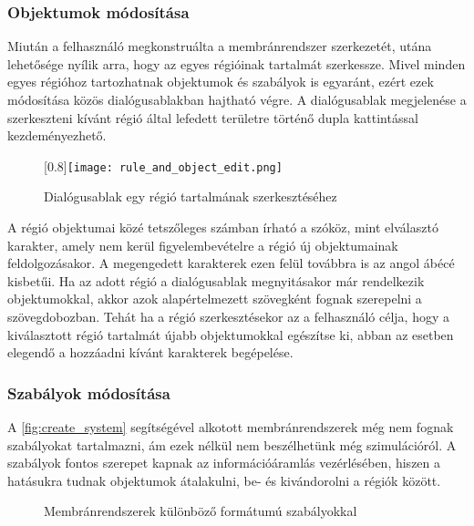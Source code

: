 
\subsubsection{Objektumok módosítása}

Miután a felhasználó megkonstruálta a membránrendszer szerkezetét, utána lehetősége nyílik arra, hogy az egyes régióinak tartalmát szerkessze. Mivel minden egyes régióhoz tartozhatnak objektumok és szabályok is egyaránt, ezért ezek módosítása közös dialógusablakban hajtható végre. A dialógusablak megjelenése a szerkeszteni kívánt régió által lefedett területre történő dupla kattintással kezdeményezhető. 

\begin{figure}[H]
	\centering
	\scalebox{0.8}[0.8]{\texttt{[image: rule\_and\_object\_edit.png]}}
	\caption{Dialógusablak egy régió tartalmának szerkesztéséhez}
	\label{fig:obj_edit}
\end{figure}

A régió objektumai közé tetszőleges számban írható a szóköz, mint elválasztó karakter, amely nem kerül figyelembevételre a régió új objektumainak feldolgozásakor. A megengedett karakterek ezen felül továbbra is az angol ábécé kisbetűi. Ha az adott régió a dialógusablak megnyitásakor már rendelkezik objektumokkal, akkor azok alapértelmezett szövegként fognak szerepelni a szövegdobozban. Tehát ha a régió szerkesztésekor az a felhasználó célja, hogy a kiválasztott régió tartalmát újabb objektumokkal egészítse ki, abban az esetben elegendő a hozzáadni kívánt karakterek begépelése.

\subsubsection{Szabályok módosítása}

A \ref{fig:create_system} segítségével alkotott membránrendszerek még nem fognak szabályokat tartalmazni, ám ezek nélkül nem beszélhetünk még szimulációról.  A szabályok fontos szerepet kapnak az információáramlás vezérlésében, hiszen a hatásukra tudnak objektumok átalakulni, be- és kivándorolni a régiók között. 

\begin{figure}[H]
	\centering
	\vspace{5pt}
	\caption{Membránrendszerek különböző formátumú szabályokkal}
	\label{fig:rule_edits}
\end{figure}

